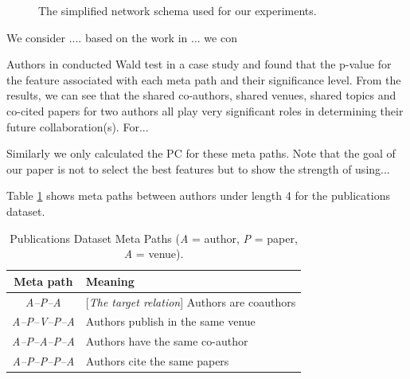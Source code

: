 \begin{figure}[t]
\centering
{}
\caption{The simplified network schema used for our experiments.} \label{Fig:expSchema}
\end{figure}


We consider .... based on the work in ... we con

Authors in \cite{sun2011ASONAM} conducted Wald test in a case study and found that the p-value for the feature associated with each meta path and their significance level. From the results, we can see that the shared co-authors, shared venues, shared topics and co-cited papers for two authors all play very significant roles in determining their future collaboration(s). For...

Similarly we only calculated the PC for these meta paths. Note that the goal of our paper is not to select the best features but to show the strength of using...

Table \ref{table_publications} shows meta paths between authors under length 4 for the publications dataset.



\begin{table}[h]
\centering
\caption{Publications Dataset Meta Paths (\textit{A} = author, \textit{P} = paper, \textit{A} = venue).}
\scriptsize
\label{table_publications}
\begin{tabular}{|c|l|} \hline
\textbf{Meta path} & \textbf{Meaning} \\ \hline

\textit{A--P--A} & [\textit{The target relation}] Authors are coauthors \\ \hline
\textit{A--P--V--P--A} & Authors publish in the same venue \\ \hline
\textit{A--P--A--P--A} & Authors have the same co-author \\ \hline
\textit{A--P--P--P--A} & Authors cite the same papers \\ \hline

\end{tabular}


\end{table}

